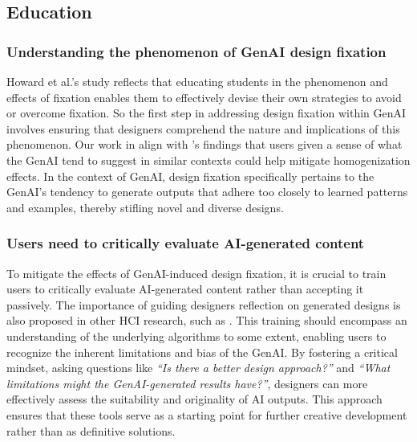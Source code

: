 

\subsection{Education}
\subsubsection{Understanding the phenomenon of GenAI design fixation}
Howard et al.'s study \cite{howard2013overcoming} reflects that educating students in the phenomenon and effects of fixation enables them to effectively devise their own strategies to avoid or overcome fixation. So the first step in addressing design fixation within GenAI involves ensuring that designers comprehend the nature and implications of this phenomenon. Our work in align with \cite{anderson2024homogenization}'s findings that users given a sense of what the GenAI tend to suggest in similar contexts could help mitigate homogenization effects. In the context of GenAI, design fixation specifically pertains to the GenAI's tendency to generate outputs that adhere too closely to learned patterns and examples, thereby stifling novel and diverse designs.

\subsubsection{Users need to critically evaluate AI-generated content}
To mitigate the effects of GenAI-induced design fixation, it is crucial to train users to critically evaluate AI-generated content rather than accepting it passively. The importance of guiding designers reflection on generated designs is also proposed in other HCI research, such as \cite{gmeiner2023exploring}. This training should encompass an understanding of the underlying algorithms to some extent, enabling users to recognize the inherent limitations and bias of the GenAI. By fostering a critical mindset, asking questions like \textit{“Is there a better design approach?”} and \textit{“What limitations might the GenAI-generated results have?”}, designers can more effectively assess the suitability and originality of AI outputs. This approach ensures that these tools serve as a starting point for further creative development rather than as definitive solutions.


